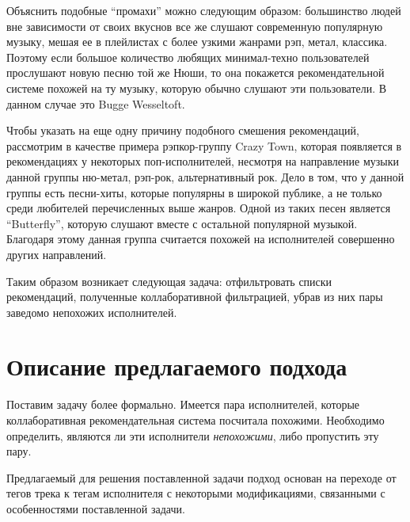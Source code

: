 Объяснить подобные ``промахи'' можно следующим образом: большинство людей вне зависимости от своих вкуснов все же слушают современную популярную
музыку, мешая ее в плейлистах с более узкими жанрами \ld рэп, метал, классика. Поэтому если большое количество любящих минимал-техно пользователей 
прослушают новую песню той же Нюши, то она покажется рекомендательной системе похожей на ту музыку, которую обычно слушают эти пользователи. В данном
случае это Bugge Wesseltoft.

Чтобы указать на еще одну причину подобного смешения рекомендаций, рассмотрим в качестве примера рэпкор-группу Crazy Town, которая появляется в 
рекомендациях у некоторых поп-исполнителей, несмотря на направление музыки данной группы \ld ню-метал, рэп-рок, альтернативный рок. Дело в том,
что у данной группы есть песни-хиты, которые популярны в широкой публике, а не только среди любителей перечисленных выше жанров. Одной из таких песен
является ``Butterfly'', которую слушают вместе с остальной популярной музыкой. Благодаря этому данная группа считается похожей на исполнителей
совершенно других направлений.

Таким образом возникает следующая задача: отфильтровать списки рекомендаций, полученные коллаборативной фильтрацией, убрав из них пары заведомо 
непохожих исполнителей.

\section{Описание предлагаемого подхода}

Поставим задачу более формально. Имеется пара исполнителей, которые коллаборативная рекомендательная система посчитала похожими. 
Необходимо определить, являются ли эти исполнители \emph{непохожими}, либо пропустить эту пару. 

Предлагаемый для решения поставленной задачи подход основан на переходе от тегов трека к тегам исполнителя с некоторыми модификациями, 
связанными с особенностями поставленной задачи. 


